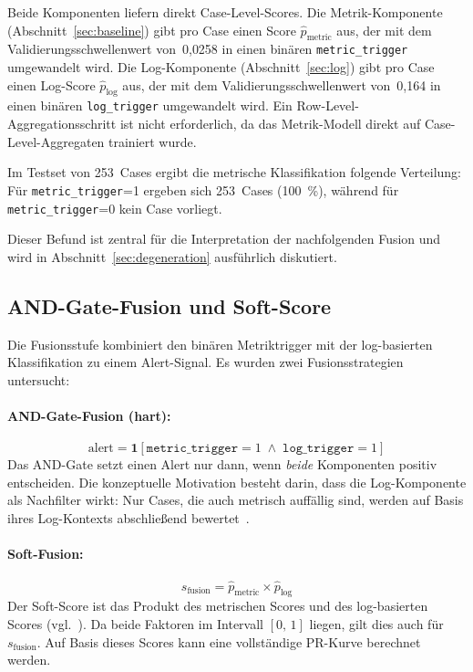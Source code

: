 Beide Komponenten liefern direkt Case-Level-Scores. Die Metrik-Komponente (Abschnitt~\ref{sec:baseline}) gibt pro Case einen Score $\hat{p}_{\text{metric}}$ aus, der mit dem Validierungsschwellenwert von~0{,}0258 in einen binären \texttt{metric\_trigger} umgewandelt wird. Die Log-Komponente (Abschnitt~\ref{sec:log}) gibt pro Case einen Log-Score $\hat{p}_{\text{log}}$ aus, der mit dem Validierungsschwellenwert von~0{,}164 in einen binären \texttt{log\_trigger} umgewandelt wird. Ein Row-Level-Aggregationsschritt ist nicht erforderlich, da das Metrik-Modell direkt auf Case-Level-Aggregaten trainiert wurde.

Im Testset von 253~Cases ergibt die metrische Klassifikation folgende Verteilung:
Für \texttt{metric\_trigger}=1 ergeben sich 253~Cases (100~\%), während für
\texttt{metric\_trigger}=0 kein Case vorliegt.

Dieser Befund ist zentral für die Interpretation der nachfolgenden Fusion und wird in Abschnitt~\ref{sec:degeneration} ausführlich diskutiert.

\subsection{AND-Gate-Fusion und Soft-Score}

Die Fusionsstufe kombiniert den binären Metriktrigger mit der log-basierten Klassifikation zu einem Alert-Signal. Es wurden zwei Fusionsstrategien untersucht:

\paragraph{AND-Gate-Fusion (hart):}
\[
  \text{alert} = \mathbf{1}[\texttt{metric\_trigger} = 1 \;\wedge\; \texttt{log\_trigger} = 1]
\]
Das AND-Gate setzt einen Alert nur dann, wenn \emph{beide} Komponenten positiv entscheiden. Die konzeptuelle Motivation besteht darin, dass die Log-Komponente als Nachfilter wirkt: Nur Cases, die auch metrisch auffällig sind, werden auf Basis ihres Log-Kontexts abschließend bewertet~\cite{kittler1998combining}.

\paragraph{Soft-Fusion:}
\[
  s_{\text{fusion}} = \hat{p}_{\text{metric}} \times \hat{p}_{\text{log}}
\]
Der Soft-Score ist das Produkt des metrischen Scores und des log-basierten Scores (vgl.~\cite{kittler1998combining}). Da beide Faktoren im Intervall $[0,\,1]$ liegen, gilt dies auch für $s_{\text{fusion}}$. Auf Basis dieses Scores kann eine vollständige PR-Kurve berechnet werden.

